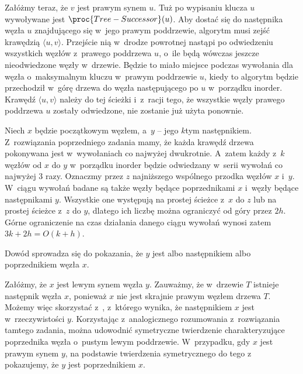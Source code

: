 Załóżmy teraz, że $v$ jest prawym synem $u$.
Tuż po wypisaniu klucza $u$ wywoływane jest $\proc{Tree-Successor}(u)$.
Aby dostać się do następnika węzła $u$ znajdującego się w~jego prawym poddrzewie, algorytm musi zejść krawędzią $\langle u,v\rangle$.
Przejście nią w~drodze powrotnej nastąpi po odwiedzeniu wszystkich węzłów z~prawego poddrzewa $u$, o~ile będą wówczas jeszcze nieodwiedzone węzły w~drzewie.
Będzie to miało miejsce podczas wywołania  dla węzła o~maksymalnym kluczu w~prawym poddrzewie $u$, kiedy to algorytm będzie przechodził w~górę drzewa do węzła następującego po $u$ w~porządku inorder.
Krawędź $\langle u,v\rangle$ należy do tej ścieżki i~z~racji tego, że wszystkie węzły prawego poddrzewa $u$ zostały odwiedzone, nie zostanie już użyta ponownie.

\exercise %
Niech $x$ będzie początkowym węzłem, a~$y$ -- jego $k$\nbhyphen tym następnikiem.
Z~rozwiązania poprzedniego zadania mamy, że każda krawędź drzewa pokonywana jest w~wywołaniach  co najwyżej dwukrotnie.
A~zatem każdy z~$k$ węzłów od $x$ do $y$ w~porządku inorder będzie odwiedzany w~serii wywołań  co najwyżej 3 razy.
Oznaczmy przez $z$ najniższego wspólnego przodka węzłów $x$ i~$y$.
W~ciągu wywołań  badane są także węzły będące poprzednikami $x$ i~węzły będące następnikami $y$.
Wszystkie one występują na prostej ścieżce z~$x$ do $z$ lub na prostej ścieżce z~$z$ do $y$, dlatego ich liczbę można ograniczyć od góry przez $2h$.
Górne ograniczenie na czas działania danego ciągu wywołań wynosi zatem $3k+2h=O(k+h)$.

\exercise %

\noindent Dowód sprowadza się do pokazania, że $y$ jest albo następnikiem albo poprzednikiem węzła $x$.

Załóżmy, że $x$ jest lewym synem węzła $y$.
Zauważmy, że w~drzewie $T$ istnieje następnik węzła $x$, ponieważ $x$ nie jest skrajnie prawym węzłem drzewa $T$.
Możemy więc skorzystać z~, z~którego wynika, że następnikiem $x$ jest w~rzeczywistości $y$.
Korzystając z~analogicznego rozumowania z~rozwiązania tamtego zadania, można udowodnić symetryczne twierdzenie charakteryzujące poprzednika węzła o~pustym lewym poddrzewie.
W~przypadku, gdy $x$ jest prawym synem $y$, na podstawie twierdzenia symetrycznego do tego z~ pokazujemy, że $y$ jest poprzednikiem $x$.
